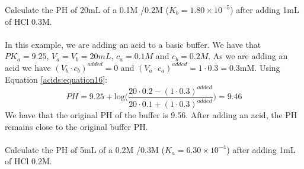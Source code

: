 \documentclass[main.tex]{subfiles}
\newcommand\chapterlabel{acids}
\begin{document}
\begin{description}
\begin{example} %
Calculate the PH of 20mL of a 0.1M /0.2M  ($K_b=1.80 \times 10^{-5}$) after adding 1mL of HCl 0.3M. \\
\\
In this example, we are adding an acid to a basic buffer. We have that $PK_a=9.25$, $V_a=V_b=20mL$, $c_a=0.1M$ and $c_b=0.2M$. As we are adding an acid we have $(V_b\cdot c_b)^{added}=0 $ and $(V_a\cdot c_a)^{added} =1\cdot 0.3=0.3$mM. Using Equation \ref{\chapterlabel:equation16}:
\[PH=9.25 + \text{log} \Big(\frac{20\cdot 0.2 - (1\cdot 0.3)^{added} }{20\cdot 0.1 + (1\cdot 0.3)^{added} }\Big)=9.46 \]
 We have that the original PH of the buffer is 9.56. After adding an acid, the PH remains close to the original buffer PH.
\\
\faDiamond\ \\
Calculate the PH of 5mL of a 0.2M /0.3M  ($K_a=6.30 \times 10^{-4}$) after adding 1mL of HCl 0.2M.
\end{example}%



\end{description}
\end{document}
